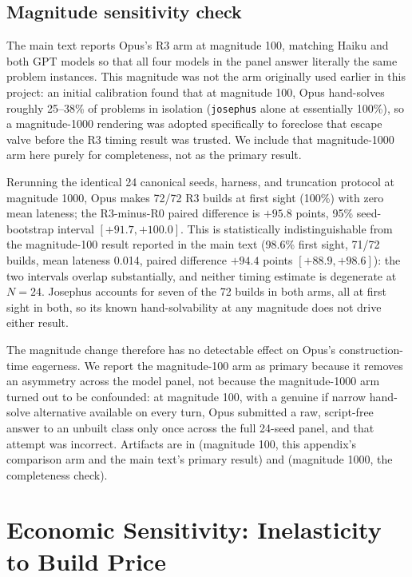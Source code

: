 \documentclass{article}
\begin{document}
\subsection{Magnitude sensitivity check} \label{app:magnitude-sensitivity}

The main text reports Opus's R3 arm at magnitude 100, matching Haiku and both GPT models so that all four models in the panel answer literally the same problem instances. This magnitude was not the arm originally used earlier in this project: an initial calibration found that at magnitude 100, Opus hand-solves roughly 25--38\% of problems in isolation (\texttt{josephus} alone at essentially 100\%), so a magnitude-1000 rendering was adopted specifically to foreclose that escape valve before the R3 timing result was trusted. We include that magnitude-1000 arm here purely for completeness, not as the primary result.

Rerunning the identical 24 canonical seeds, harness, and truncation protocol at magnitude 1000, Opus makes 72/72 R3 builds at first sight (100\%) with zero mean lateness; the R3-minus-R0 paired difference is $+95.8$ points, 95\% seed-bootstrap interval $[+91.7,+100.0]$. This is statistically indistinguishable from the magnitude-100 result reported in the main text (98.6\% first sight, 71/72 builds, mean lateness 0.014, paired difference $+94.4$ points $[+88.9,+98.6]$): the two intervals overlap substantially, and neither timing estimate is degenerate at $N=24$. Josephus accounts for seven of the 72 builds in both arms, all at first sight in both, so its known hand-solvability at any magnitude does not drive either result.

The magnitude change therefore has no detectable effect on Opus's construction-time eagerness. We report the magnitude-100 arm as primary because it removes an asymmetry across the model panel, not because the magnitude-1000 arm turned out to be confounded: at magnitude 100, with a genuine if narrow hand-solve alternative available on every turn, Opus submitted a raw, script-free answer to an unbuilt class only once across the full 24-seed panel, and that attempt was incorrect. Artifacts are in  (magnitude 100, this appendix's comparison arm and the main text's primary result) and  (magnitude 1000, the completeness check).

\section{Economic Sensitivity: Inelasticity to Build Price} \label{app:economic}
\end{document}
